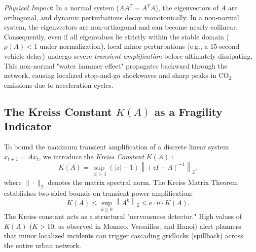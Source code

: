 \documentclass[lettersize,journal]{IEEEtran}
\begin{document}
\textit{Physical Impact}: In a normal system ($A A^T = A^T A$), the eigenvectors of $A$ are orthogonal, and dynamic perturbations decay monotonically. In a non-normal system, the eigenvectors are non-orthogonal and can become nearly collinear. Consequently, even if all eigenvalues lie strictly within the stable domain ($\rho(A) < 1$ under normalization), local minor perturbations (e.g., a 15-second vehicle delay) undergo severe \emph{transient amplification} before ultimately dissipating. This non-normal "water hammer effect" propagates backward through the network, causing localized stop-and-go shockwaves and sharp peaks in $\text{CO}_2$ emissions due to acceleration cycles.

\subsection{The Kreiss Constant $K(A)$ as a Fragility Indicator}
To bound the maximum transient amplification of a discrete linear system $x_{t+1} = A x_t$, we introduce the \emph{Kreiss Constant} $K(A)$ \cite{Kreiss1962}:
\begin{equation}
K(A) = \sup_{|z| > 1} (|z| - 1) \left\| (zI - A)^{-1} \right\|_2,
\end{equation}
where $\|\cdot\|_2$ denotes the matrix spectral norm. The Kreiss Matrix Theorem establishes two-sided bounds on transient power amplification:
\begin{equation}
K(A) \le \sup_{k \ge 0} \left\| A^k \right\|_2 \le e \cdot n \cdot K(A).
\end{equation}
The Kreiss constant acts as a structural "nervousness detector." High values of $K(A)$ ($K > 10$, as observed in Monaco, Versailles, and Hanoi) alert planners that minor localized incidents can trigger cascading gridlocks (spillback) across the entire urban network.
\end{document}
